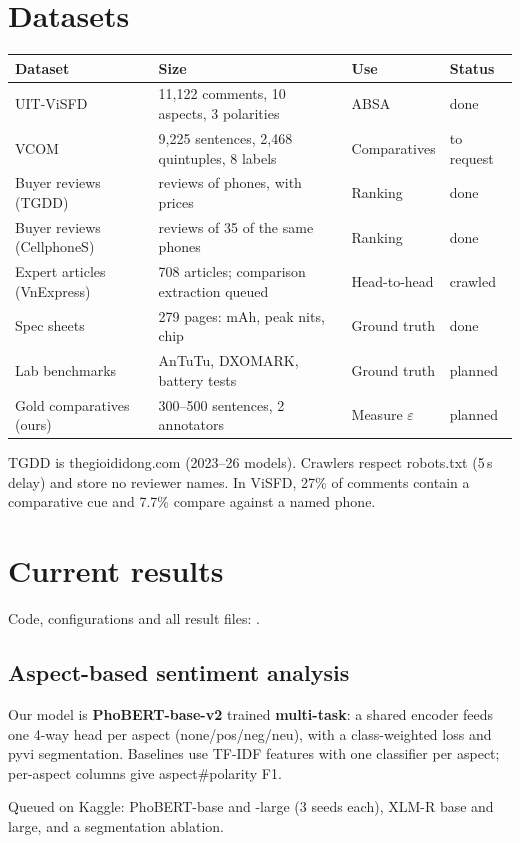 \documentclass{article}
\begin{document}
\section{Datasets}
\begin{center}\small
\begin{tabularx}{\linewidth}{@{}lYll@{}}
\toprule
Dataset & Size & Use & Status \\
\midrule
UIT-ViSFD \citep{visfd} & 11{,}122 comments, 10 aspects, 3 polarities & ABSA & done \\
VCOM \citep{vcom} & 9{,}225 sentences, 2{,}468 quintuples, 8 labels & Comparatives & to request \\
Buyer reviews (TGDD) & \NReviewsTGDD{} reviews of \NProducts{} phones, with prices & Ranking & done \\
Buyer reviews (CellphoneS) & \NReviewsCPS{} reviews of 35 of the same phones & Ranking & done \\
Expert articles (VnExpress) & 708 articles; comparison extraction queued & Head-to-head & crawled \\
Spec sheets & 279 pages: mAh, peak nits, chip & Ground truth & done \\
Lab benchmarks & AnTuTu, DXOMARK, battery tests & Ground truth & planned \\
Gold comparatives (ours) & 300--500 sentences, 2 annotators & Measure $\varepsilon$ & planned \\
\bottomrule
\end{tabularx}
\end{center}
\vspace{-4pt}
TGDD is thegioididong.com (2023--26 models). Crawlers respect robots.txt (5\,s delay) and store no reviewer names.
In ViSFD, 27\% of comments contain a comparative cue and 7.7\% compare against a named phone.

\section{Current results}
Code, configurations and all result files: \repo.

\subsection{Aspect-based sentiment analysis}
Our model is \textbf{PhoBERT-base-v2} \citep{phobert} trained \textbf{multi-task}: a shared encoder feeds one 4-way head per aspect
(none/pos/neg/neu), with a class-weighted loss and pyvi segmentation. Baselines use TF-IDF features with one classifier per aspect;
per-aspect columns give aspect\#polarity F1.
\begin{center}\small\setlength{\tabcolsep}{5pt}\end{center}
\vspace{-4pt}
Queued on Kaggle: PhoBERT-base and -large (3 seeds each), XLM-R base and large, and a segmentation ablation.
\end{document}
